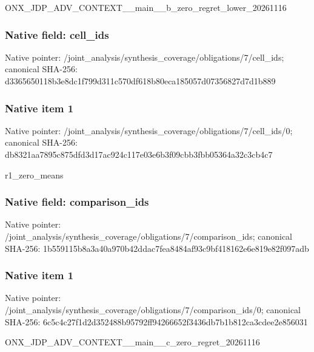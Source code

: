 \documentclass[10pt,a4paper]{article}
\begin{document}
\begingroup\raggedright\sloppy ONX\_\allowbreak{}JDP\_\allowbreak{}ADV\_\allowbreak{}CONTEXT\_\allowbreak{}\_\allowbreak{}main\_\allowbreak{}\_\allowbreak{}b\_\allowbreak{}zero\_\allowbreak{}regret\_\allowbreak{}lower\_\allowbreak{}20261116\par\endgroup

\subsubsection{Native field: cell\_\allowbreak{}ids}
Native pointer: /joint\_\allowbreak{}analysis/synthesis\_\allowbreak{}coverage/obligations/7/cell\_\allowbreak{}ids; canonical SHA-256: d3365650118b3e8dc1f799d311c570df618b80eca185057d07356827d7d1b889

\subsubsection{Native item 1}
Native pointer: /joint\_\allowbreak{}analysis/synthesis\_\allowbreak{}coverage/obligations/7/cell\_\allowbreak{}ids/0; canonical SHA-256: db8321aa7895c875dfd3d17ac924c117e03e6b3f09cbb3fbb05364a32c3cb4c7

\begingroup\raggedright\sloppy r1\_\allowbreak{}zero\_\allowbreak{}means\par\endgroup

\subsubsection{Native field: comparison\_\allowbreak{}ids}
Native pointer: /joint\_\allowbreak{}analysis/synthesis\_\allowbreak{}coverage/obligations/7/comparison\_\allowbreak{}ids; canonical SHA-256: 1b559115b8a3a40a970b42ddac7fea8484af93c9bf418162e6e819e82f097adb

\subsubsection{Native item 1}
Native pointer: /joint\_\allowbreak{}analysis/synthesis\_\allowbreak{}coverage/obligations/7/comparison\_\allowbreak{}ids/0; canonical SHA-256: 6c5c4c27f1d2d352488b95792ff94266652f3436db7b1b812ca3cdee2e856031

\begingroup\raggedright\sloppy ONX\_\allowbreak{}JDP\_\allowbreak{}ADV\_\allowbreak{}CONTEXT\_\allowbreak{}\_\allowbreak{}main\_\allowbreak{}\_\allowbreak{}c\_\allowbreak{}zero\_\allowbreak{}regret\_\allowbreak{}20261116\par\endgroup
\end{document}

